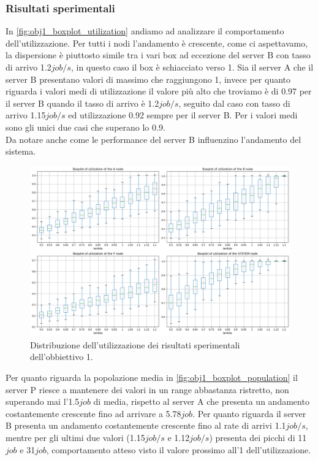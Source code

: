 \subsubsection{Risultati sperimentali}
In \autoref{fig:obj1_boxplot_utilization} andiamo ad analizzare il comportamento dell'utilizzazione. Per tutti i nodi l'andamento è crescente, come ci aspettavamo, la dispersione è piuttosto simile tra i vari box ad eccezione del server B con tasso di arrivo 1.2$job/s$, in questo caso il box è schiacciato verso 1. Sia il server A che il server B presentano valori di massimo che raggiungono 1, invece per quanto riguarda i valori medi di utilizzazione il valore più alto che troviamo è di 0.97 per il server B quando il tasso di arrivo è 1.2$job/s$, seguito dal caso con tasso di arrivo 1.15$job/s$ ed utilizzazione 0.92 sempre per il server B. Per i valori medi sono gli unici due casi che superano lo 0.9.\\
Da notare anche come le performance del server B influenzino l'andamento del sistema.
\begin{figure}
    \centering
    \includegraphics[width=\textwidth]{figs//results/obj1/obj1-box-utilization.png}
    \caption{Distribuzione dell'utilizzazione dei risultati sperimentali dell'obbiettivo 1.}
    \label{fig:obj1_boxplot_utilization}
\end{figure}
Per quanto riguarda la popolazione media in \autoref{fig:obj1_boxplot_population} il server P riesce a mantenere dei valori in un range abbastanza ristretto, non superando mai l'1.5$job$ di media, rispetto al server A che presenta un andamento costantemente crescente fino ad arrivare a 5.78$job$. Per quanto riguarda il server B presenta un andamento costantemente crescente fino al rate di arrivi 1.1$job/s$, mentre per gli ultimi due valori (1.15$job/s$ e 1.12$job/s$) presenta dei picchi di 11$job$ e 31$job$, comportamento atteso visto il valore prossimo all'1 dell'utilizzazione.
